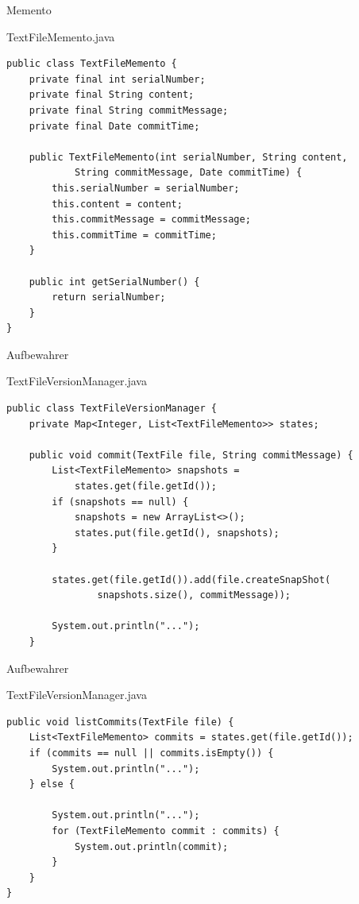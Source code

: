 \begin{frame}[fragile]{Memento}
	\begin{exampleblock}{TextFileMemento.java}
 		\begin{lstlisting}
public class TextFileMemento {
	private final int serialNumber;
	private final String content;
	private final String commitMessage;
	private final Date commitTime;
	
	public TextFileMemento(int serialNumber, String content, 
            String commitMessage, Date commitTime) {
		this.serialNumber = serialNumber;
		this.content = content;
		this.commitMessage = commitMessage;
		this.commitTime = commitTime;
	}

	public int getSerialNumber() {
		return serialNumber;
	}
}
 		\end{lstlisting}
 	\end{exampleblock}
\end{frame}

\begin{frame}[fragile]{Aufbewahrer}
	\begin{exampleblock}{TextFileVersionManager.java}
 		\begin{lstlisting}
public class TextFileVersionManager {
	private Map<Integer, List<TextFileMemento>> states;
	
    public void commit(TextFile file, String commitMessage) {
        List<TextFileMemento> snapshots = 
            states.get(file.getId());
        if (snapshots == null) {
            snapshots = new ArrayList<>();
            states.put(file.getId(), snapshots);
        }

        states.get(file.getId()).add(file.createSnapShot(
        		snapshots.size(), commitMessage));

        System.out.println("...");
    }
 		\end{lstlisting}
 	\end{exampleblock}
\end{frame}

\begin{frame}[fragile]{Aufbewahrer}
	\begin{exampleblock}{TextFileVersionManager.java}
 		\begin{lstlisting}
public void listCommits(TextFile file) {
    List<TextFileMemento> commits = states.get(file.getId());
    if (commits == null || commits.isEmpty()) {
        System.out.println("...");
    } else {

        System.out.println("...");
        for (TextFileMemento commit : commits) {
            System.out.println(commit);
        }
    }
}
 		\end{lstlisting}
 	\end{exampleblock}
\end{frame}

